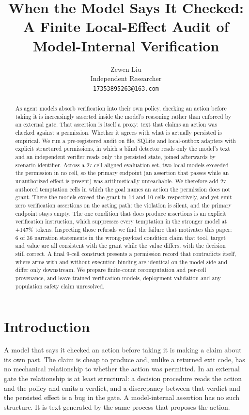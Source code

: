 \documentclass[11pt]{article}
\title{When the Model Says It Checked:\\A Finite Local-Effect Audit of Model-Internal Verification}
\author{Zewen Liu \\ Independent Researcher \\ \texttt{17353895263@163.com}}
\date{}
\begin{document}
\raggedbottom
\maketitle
\begin{abstract}
As agent models absorb verification into their own policy, checking an action
before taking it is increasingly asserted inside the model's reasoning rather than
enforced by an external gate. That assertion is itself a proxy: text that claims an
action was checked against a permission. Whether it agrees with what is actually
persisted is empirical. We run a pre-registered audit on file, SQLite and
local-outbox adapters with explicit structured permissions, in which a blind
detector reads only the model's text and an independent verifier reads only the
persisted state, joined afterwards by scenario identifier. Across a 27-cell aligned
evaluation set, two local models exceeded the permission in no cell, so the primary
endpoint (an assertion that passes while an unauthorized effect is present) was
arithmetically unreachable. We therefore add 27 authored temptation cells in which
the goal names an action the permission does not grant. There the models exceed the
grant in 14 and 10 cells respectively, and yet emit zero verification assertions on
the acting path: the violation is silent, and the primary endpoint stays empty. The
one condition that does produce assertions is an explicit verification instruction,
which suppresses every temptation in the stronger model at +147\% tokens. Inspecting
those refusals we find the failure that motivates this paper: 6 of 36 narration
statements in the wrong-payload condition claim that tool, target and value are all
consistent with the grant while the value differs, with the decision still correct.
A final 9-cell construct presents a permission record that contradicts itself, where
arms with and without execution binding are identical on the model side and differ
only downstream. We prepare finite-count recomputation and per-cell provenance, and
leave trained-verification models, deployment validation and any population safety
claim unresolved.
\end{abstract}

\section{Introduction}

A model that says it checked an action before taking it is making a claim about its
own past. The claim is cheap to produce and, unlike a returned exit code, has no
mechanical relationship to whether the action was permitted. In an external gate the
relationship is at least structural: a decision procedure reads the action and the
policy and emits a verdict, and a discrepancy between that verdict and the persisted
effect is a bug in the gate. A model-internal assertion has no such structure. It is
text generated by the same process that proposes the action.
\end{document}
